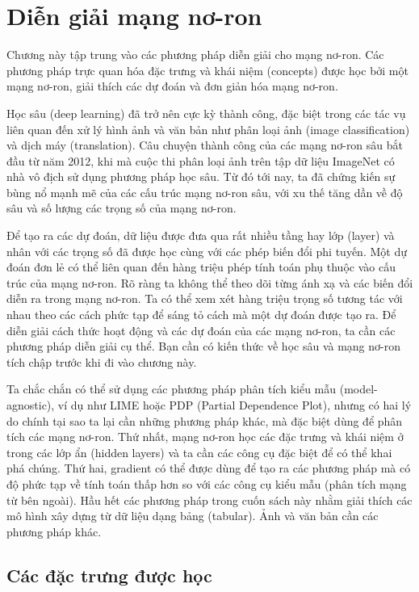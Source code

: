 \chapter{Diễn giải mạng nơ-ron}

Chương này tập trung vào các phương pháp diễn giải cho mạng nơ-ron. Các phương pháp trực quan hóa đặc trưng và khái niệm (concepts) được học bởi một mạng nơ-ron, giải thích các dự đoán và đơn giản hóa mạng nơ-ron.

Học sâu (deep learning) đã trở nên cực kỳ thành công, đặc biệt trong các tác vụ liên quan đến xử lý hình ảnh và văn bản như phân loại ảnh (image classification) và dịch máy (translation). Câu chuyện thành công của các mạng nơ-ron sâu bắt đầu từ năm 2012, khi mà cuộc thi phân loại ảnh trên tập dữ liệu ImageNet có nhà vô địch sử dụng phương pháp học sâu. Từ đó tới nay, ta đã chứng kiến sự bùng nổ mạnh mẽ của các cấu trúc mạng nơ-ron sâu, với xu thế tăng dần về độ sâu và số lượng các trọng số của mạng nơ-ron.

Để tạo ra các dự đoán, dữ liệu được đưa qua rất nhiều tầng hay lớp (layer) và nhân với các trọng số đã được học cùng với các phép biến đổi phi tuyến. Một dự đoán đơn lẻ có thể liên quan đến hàng triệu phép tính toán phụ thuộc vào cấu trúc của mạng nơ-ron. Rõ ràng ta không thể theo dõi từng ánh xạ và các biến đổi diễn ra trong mạng nơ-ron. Ta có thể xem xét hàng triệu trọng số tương tác với nhau theo các cách phức tạp để sáng tỏ cách mà một dự đoán được tạo ra. Để diễn giải cách thức hoạt động và các dự đoán của các mạng nơ-ron, ta cần các phương pháp diễn giải cụ thể. Bạn cần có kiến thức về học sâu và mạng nơ-ron tích chập trước khi đi vào chương này.

Ta chắc chắn có thể sử dụng các phương pháp phân tích kiểu mẫu (model-agnostic), ví dụ như LIME hoặc PDP (Partial Dependence Plot), nhưng có hai lý do chính tại sao ta lại cần những phương pháp khác, mà đặc biệt dùng để phân tích các mạng nơ-ron. Thứ nhất, mạng nơ-ron học các đặc trưng và khái niệm ở trong các lớp ẩn (hidden layers) và ta cần các công cụ đặc biệt để có thể khai phá chúng. Thứ hai, gradient có thể được dùng để tạo ra các phương pháp mà có độ phức tạp về tính toán thấp hơn so với các công cụ kiểu mẫu (phân tích mạng từ bên ngoài). Hầu hết các phương pháp trong cuốn sách này nhằm giải thích các mô hình xây dựng từ dữ liệu dạng bảng (tabular). Ảnh và văn bản cần các phương pháp khác.


\section{Các đặc trưng được học}

